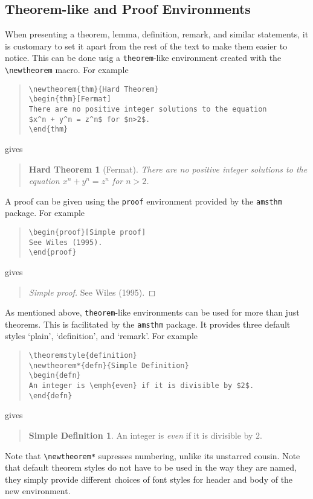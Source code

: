 \subsection{Theorem-like and Proof Environments}
When presenting a theorem, lemma, definition, remark, and similar statements,
it is customary to set it apart from the rest of the text to make them
easier to notice. This can be done usig a \texttt{theorem}-like environment
created with the {\tt \verb|\newtheorem|} macro. For example
\begin{quote}
\begin{verbatim}
\newtheorem{thm}{Hard Theorem}
\begin{thm}[Fermat]
There are no positive integer solutions to the equation
$x^n + y^n = z^n$ for $n>2$.
\end{thm}
\end{verbatim}
\end{quote}
gives
\begin{quote}
\newtheorem{thm}{Hard Theorem}
\begin{thm}[Fermat]
There are no positive integer solutions to the equation
$x^n + y^n = z^n$ for $n>2$.
\end{thm}
\end{quote}
A proof can be given using the \texttt{proof} environment provided
by the \texttt{amsthm} package. For example
\begin{quote}
\begin{verbatim}
\begin{proof}[Simple proof]
See Wiles (1995).
\end{proof}
\end{verbatim}
\end{quote}
gives
\begin{quote}
\begin{proof}[Simple proof]
See Wiles (1995).
\end{proof}
\end{quote}

As mentioned above, \texttt{theorem}-like environments can be used for more
than just theorems. This is facilitated by the \texttt{amsthm} package.
It provides three default styles `plain', `definition', and `remark'.
For example
\begin{quote}
\begin{verbatim}
\theoremstyle{definition}
\newtheorem*{defn}{Simple Definition}
\begin{defn}
An integer is \emph{even} if it is divisible by $2$.
\end{defn}
\end{verbatim}
\end{quote}
gives
\begin{quote}
\theoremstyle{definition}
\newtheorem*{defn}{Simple Definition}
\begin{defn}
An integer is \emph{even} if it is divisible by $2$.
\end{defn}
\end{quote}
Note that \verb|\newtheorem*| supresses numbering, unlike its
unstarred cousin. Note that default theorem styles do not have to
be used in the way they are named, they simply provide different
choices of font styles for header and body of the new environment.

